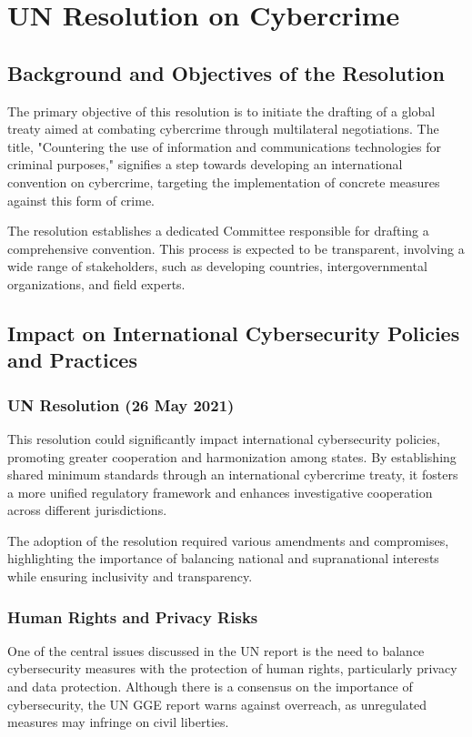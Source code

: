 \chapter{UN Resolution on Cybercrime}

\section{Background and Objectives of the Resolution}
The primary objective of this resolution is to initiate the drafting of a global treaty aimed at combating cybercrime through multilateral negotiations. The title, "Countering the use of information and communications technologies for criminal purposes," signifies a step towards developing an international convention on cybercrime, targeting the implementation of concrete measures against this form of crime. \bigskip

The resolution establishes a dedicated Committee responsible for drafting a comprehensive convention. This process is expected to be transparent, involving a wide range of stakeholders, such as developing countries, intergovernmental organizations, and field experts.

\section{Impact on International Cybersecurity Policies and Practices}

\subsection{UN Resolution (26 May 2021)}
This resolution could significantly impact international cybersecurity policies, promoting greater cooperation and harmonization among states. By establishing shared minimum standards through an international cybercrime treaty, it fosters a more unified regulatory framework and enhances investigative cooperation across different jurisdictions. \bigskip

The adoption of the resolution required various amendments and compromises, highlighting the importance of balancing national and supranational interests while ensuring inclusivity and transparency.

\subsection{Human Rights and Privacy Risks}
One of the central issues discussed in the UN report is the need to balance cybersecurity measures with the protection of human rights, particularly privacy and data protection. Although there is a consensus on the importance of cybersecurity, the UN GGE report warns against overreach, as unregulated measures may infringe on civil liberties.

